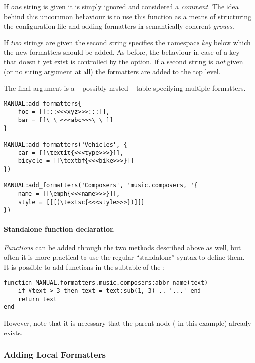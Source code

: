 \documentclass[12pt]{scrartcl}
\begin{document}
If \emph{one} string is given it is simply ignored and considered a
\emph{comment}. The idea behind this uncommon behaviour is to use this function
as a means of structuring the configuration file and adding formatters in
semantically coherent \emph{groups}.

If \emph{two} strings are given the second string specifies the namespace \emph{key} below which the new formatters should be added.  As before, the behaviour in case of a key that doesn't yet exist is controlled by the  option.  If a second string is \emph{not} given (or no string argument at all) the formatters are added to the top level.

The final argument is a -- possibly nested -- table specifying multiple
formatters.

\begin{verbatim}
MANUAL:add_formatters{
	foo = [[:::<<<xyz>>>:::]],
	bar = [[\_\_<<<abc>>>\_\_]]
}

MANUAL:add_formatters('Vehicles', {
	car = [[\textit{<<<type>>>}]],
	bicycle = [[\textbf{<<<bike>>>}]]
})

MANUAL:add_formatters('Composers', 'music.composers, '{
	name = [[\emph{<<<name>>>}]],
	style = [[[(\textsc{<<<style>>>})]]]
})
\end{verbatim}


\paragraph{Standalone function declaration}

\emph{Functions} can be added through the two methods described above as well, but often it is more practical to use the regular “standalone” syntax to define them.  It is possible to add functions in the  subtable of the :

\begin{verbatim}
function MANUAL.formatters.music.composers:abbr_name(text)
	if #text > 3 then text = text:sub(1, 3) .. '...' end
    return text
end
\end{verbatim}

\noindent However, note that it is necessary that the parent node
( in this example) already exists.


\subsubsection{Adding Local Formatters}
\label{sec:usage:adding-local-formatters}
\end{document}

